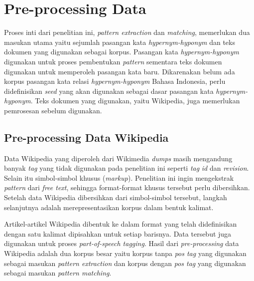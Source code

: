 \section{Pre-processing Data}
Proses inti dari penelitian ini, \textit{pattern extraction} dan \textit{matching}, memerlukan dua masukan utama yaitu sejumlah pasangan kata \textit{hypernym-hyponym} dan teks dokumen yang digunakan sebagai korpus. Pasangan kata \textit{hypernym-hyponym} digunakan untuk proses pembentukan \textit{pattern} sementara teks dokumen digunakan untuk memperoleh pasangan kata baru. Dikarenakan belum ada korpus pasangan kata relasi \textit{hypernym-hyponym} Bahasa Indonesia, perlu didefinisikan \textit{seed} yang akan digunakan sebagai dasar pasangan kata \textit{hypernym-hyponym}. Teks dokumen yang digunakan, yaitu Wikipedia, juga memerlukan pemrosesan sebelum digunakan.

\subsection{Pre-processing Data Wikipedia}
Data Wikipedia yang diperoleh dari Wikimedia \textit{dumps} masih mengandung banyak \textit{tag} yang tidak digunakan pada penelitian ini seperti \textit{tag} \textit{id} dan \textit{revision}. Selain itu simbol-simbol khusus (\textit{markup}). Penelitian ini ingin mengekstrak \textit{pattern} dari \textit{free text}, sehingga format-format khusus tersebut perlu dibersihkan. Setelah data Wikipedia dibersihkan dari simbol-simbol tersebut, langkah selanjutnya adalah merepresentasikan korpus dalam bentuk kalimat. 

Artikel-artikel Wikipedia dibentuk ke dalam format yang telah didefinisikan dengan satu kalimat dipisahkan untuk setiap barisnya. Data tersebut juga digunakan untuk proses \textit{part-of-speech tagging}. Hasil dari \textit{pre-processing} data Wikipedia adalah dua korpus besar yaitu korpus tanpa \textit{pos tag} yang digunakan sebagai masukan \textit{pattern extraction} dan korpus dengan \textit{pos tag} yang digunakan sebagai masukan \textit{pattern matching}. 

